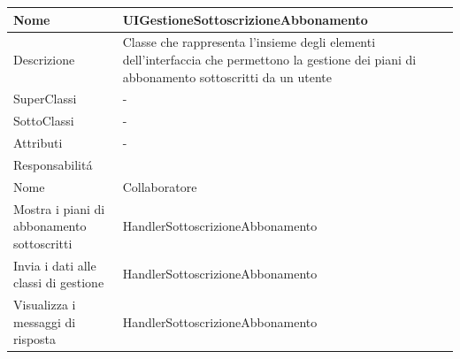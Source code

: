 \begin{center}
    \begin{longtable}{ |p{3cm}|p{3cm}|p{3cm}|p{3cm}| }
        \hline
        Nome & \multicolumn{3}{|p{9cm}|}{UIGestioneSottoscrizioneAbbonamento} \\\hline
        Descrizione & \multicolumn{3}{|p{9cm}|}{Classe che rappresenta l'insieme degli elementi dell'interfaccia che permettono la gestione dei piani di abbonamento sottoscritti da un utente} \\\hline
        SuperClassi & \multicolumn{3}{|p{9cm}|}{-} \\\hline
        SottoClassi & \multicolumn{3}{|p{9cm}|}{-} \\\hline
        Attributi & \multicolumn{3}{|p{9cm}|}{-} \\\hline
        \multicolumn{4}{|p{12cm}|}{Responsabilit\'a} \\\hline
        \multicolumn{2}{|p{5cm}|}{Nome} & \multicolumn{2}{|p{7cm}|}{Collaboratore} \\\hline
        \multicolumn{2}{|p{5cm}|}{Mostra i piani di abbonamento sottoscritti} & \multicolumn{2}{|p{7cm}|}{HandlerSottoscrizioneAbbonamento} \\\hline
        \multicolumn{2}{|p{5cm}|}{Invia i dati alle classi di gestione} & \multicolumn{2}{|p{7cm}|}{HandlerSottoscrizioneAbbonamento} \\\hline
        \multicolumn{2}{|p{5cm}|}{Visualizza i messaggi di risposta} & \multicolumn{2}{|p{7cm}|}{HandlerSottoscrizioneAbbonamento} \\\hline
    \end{longtable}
\end{center}

